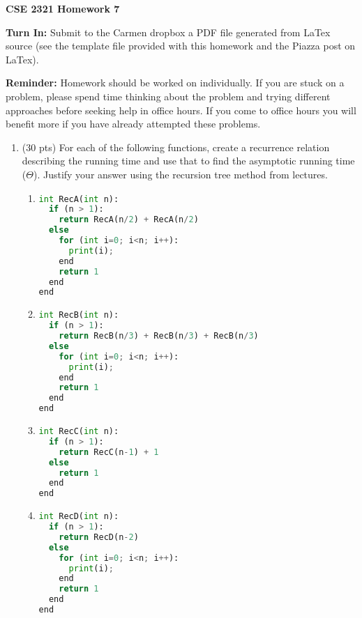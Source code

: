\documentclass[14pt]{extarticle}
\begin{document}
\textbf{CSE 2321 Homework 7}

\textbf{Turn In:} Submit to the Carmen dropbox a PDF file generated from LaTex source (see the template file provided with this homework and the Piazza post on LaTex).

\textbf{Reminder:} Homework should be worked on individually. If you are stuck on a problem, please spend time thinking about the problem and trying different approaches before seeking help in office hours. If you come to office hours you will benefit more if you have already attempted these problems. 


\begin{enumerate}

\item (30 pts) For each of the following functions, create a recurrence relation describing the running time and use that to find the asymptotic running time ($\Theta$). Justify your answer using the recursion tree method from lectures.
\begin{enumerate}
\item %
\begin{lstlisting}[language=Python]
int RecA(int n):
  if (n > 1):
    return RecA(n/2) + RecA(n/2)
  else
    for (int i=0; i<n; i++):
      print(i);
    end
    return 1
  end
end
\end{lstlisting}

\item %
\begin{lstlisting}[language=Python]
int RecB(int n):
  if (n > 1):
    return RecB(n/3) + RecB(n/3) + RecB(n/3)
  else
    for (int i=0; i<n; i++):
      print(i);
    end
    return 1
  end
end
\end{lstlisting}


\item %
\begin{lstlisting}[language=Python]
int RecC(int n):
  if (n > 1):
    return RecC(n-1) + 1
  else
    return 1
  end
end
\end{lstlisting}

\item %
\begin{lstlisting}[language=Python]
int RecD(int n):
  if (n > 1):
    return RecD(n-2)
  else
    for (int i=0; i<n; i++):
      print(i);
    end
    return 1
  end
end
\end{lstlisting}


\end{enumerate}
\end{enumerate}
\end{document}
